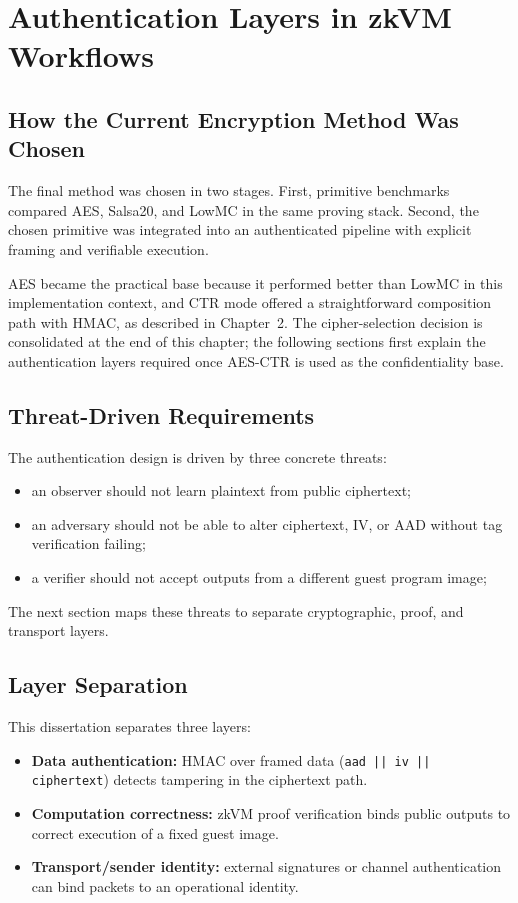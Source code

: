 \chapter{Authentication Layers in zkVM Workflows}

\section{How the Current Encryption Method Was Chosen}

The final method was chosen in two stages. First, primitive benchmarks compared
AES, Salsa20, and LowMC in the same proving stack. Second, the chosen primitive
was integrated into an authenticated pipeline with explicit framing and
verifiable execution.

AES became the practical base because it performed better than LowMC in this
implementation context, and CTR mode offered a straightforward composition path
with HMAC, as described in Chapter~2.
The cipher-selection decision is consolidated at the end of this chapter; the
following sections first explain the authentication layers required once AES-CTR
is used as the confidentiality base.

\section{Threat-Driven Requirements}

The authentication design is driven by three concrete threats:

\begin{itemize}
\item an observer should not learn plaintext from public ciphertext;
\item an adversary should not be able to alter ciphertext, IV, or AAD without tag
verification failing;
\item a verifier should not accept outputs from a different guest program image;
\end{itemize}

The next section maps these threats to separate cryptographic, proof, and
transport layers.

\section{Layer Separation}

This dissertation separates three layers:

\begin{itemize}
\item \textbf{Data authentication:} HMAC over framed data
(\texttt{aad || iv || ciphertext}) detects tampering in the ciphertext path.
\item \textbf{Computation correctness:} zkVM proof verification binds public
outputs to correct execution of a fixed guest image.
\item \textbf{Transport/sender identity:} external signatures or channel
authentication can bind packets to an operational identity.
\end{itemize}

